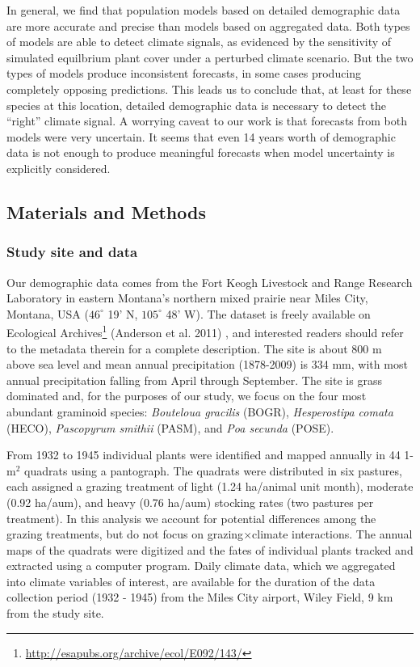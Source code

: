 \documentclass[12pt,]{article}
\begin{document}
In general, we find that population models based on detailed demographic
data are more accurate and precise than models based on aggregated data.
Both types of models are able to detect climate signals, as evidenced by
the sensitivity of simulated equilbrium plant cover under a perturbed
climate scenario. But the two types of models produce inconsistent
forecasts, in some cases producing completely opposing predictions. This
leads us to conclude that, at least for these species at this location,
detailed demographic data is necessary to detect the ``right'' climate
signal. A worrying caveat to our work is that forecasts from both models
were very uncertain. It seems that even 14 years worth of demographic
data is not enough to produce meaningful forecasts when model
uncertainty is explicitly considered.

\subsection{Materials and Methods}\label{materials-and-methods}

\subsubsection{Study site and data}\label{study-site-and-data}

Our demographic data comes from the Fort Keogh Livestock and Range
Research Laboratory in eastern Montana's northern mixed prairie near
Miles City, Montana, USA ($46^{\circ}$ 19' N, $105^{\circ}$ 48' W). The
dataset is freely available on Ecological Archives\footnote{\url{http://esapubs.org/archive/ecol/E092/143/}}
(Anderson et al. 2011) , and interested readers should refer to the
metadata therein for a complete description. The site is about 800 m
above sea level and mean annual precipitation (1878-2009) is 334 mm,
with most annual precipitation falling from April through September. The
site is grass dominated and, for the purposes of our study, we focus on
the four most abundant graminoid species: \emph{Bouteloua gracilis}
(BOGR), \emph{Hesperostipa comata} (HECO), \emph{Pascopyrum smithii}
(PASM), and \emph{Poa secunda} (POSE).

From 1932 to 1945 individual plants were identified and mapped annually
in 44 1-$\text{m}^2$ quadrats using a pantograph. The quadrats were
distributed in six pastures, each assigned a grazing treatment of light
(1.24 ha/animal unit month), moderate (0.92 ha/aum), and heavy (0.76
ha/aum) stocking rates (two pastures per treatment). In this analysis we
account for potential differences among the grazing treatments, but do
not focus on grazing$\times$climate interactions. The annual maps of the
quadrats were digitized and the fates of individual plants tracked and
extracted using a computer program. Daily climate data, which we
aggregated into climate variables of interest, are available for the
duration of the data collection period (1932 - 1945) from the Miles City
airport, Wiley Field, 9 km from the study site.
\end{document}

